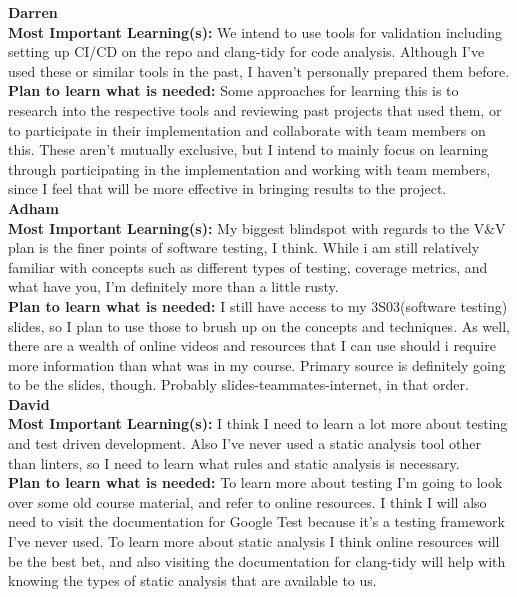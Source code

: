 \documentclass[12pt, titlepage]{article}
\begin{document}
\noindent\textbf{Darren}\\
\textbf{Most Important Learning(s):} We intend to use tools for validation including setting up CI/CD on the repo and clang-tidy for code analysis. Although I've used these or similar tools in the past, I haven't personally prepared them before.\\
\textbf{Plan to learn what is needed:} Some approaches for learning this is to research into the respective tools and reviewing past projects that used them, or to participate in their implementation and collaborate with team members on this. These aren't mutually exclusive, but I intend to mainly focus on learning through participating in the implementation and working with team members, since I feel that will be more effective in bringing results to the project.\\

\noindent\textbf{Adham}\\
\textbf{Most Important Learning(s):} My biggest blindspot with regards to the V\&V plan is the finer points of software testing, I think. While i am still relatively familiar
with concepts such as different types of testing, coverage metrics, and what have you, I'm definitely more than a little rusty.\\
\textbf{Plan to learn what is needed:} I still have access to my 3S03(software testing) slides, so I plan to use those to brush up on the concepts and techniques. As well,
there are a wealth of online videos and resources that I can use should i require more information than what was in my course. Primary source is definitely going to be the
slides, though. Probably slides-teammates-internet, in that order. \\

\noindent\textbf{David}\\
\textbf{Most Important Learning(s):} I think I need to learn a lot more about testing and test driven development.
Also I've never used a static analysis tool other than linters, so I need to learn what rules and static analysis
is necessary.\\
\textbf{Plan to learn what is needed:} To learn more about testing I'm going to look over some old course material,
and refer to online resources. I think I will also need to visit the documentation for Google Test because it's
a testing framework I've never used. To learn more about static analysis I think online resources will be the best
bet, and also visiting the documentation for clang-tidy will help with knowing the types of static analysis that
are available to us.\\
\end{document}
